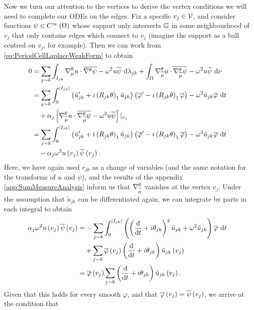 Now we turn our attention to the vertices to derive the vertex conditions we will need to complete our ODEs on the edges.
Fix a specific $v_j\in \mathcal{V}$, and consider functions $\psi\in C^{\infty}\left( \Omega \right)$ whose support only intersects $\mathbb{G}$ in some neighbourhood of $v_j$ that only contains edges which connect to $v_j$ (imagine the support as a ball centred on $v_j$, for example).
Then we can work from \eqref{eq:PeriodCellLaplaceWeakForm} to obtain
\begin{align*}
	0 &= \sum_{j\sim k} \int_{I_{jk}} \nabla^{\theta}_\mu u \cdot \overline{\nabla^{\theta}\psi} - \omega^2 u\overline{\psi}  \ \mathrm{d}\lambda_{jk} 
	+ \int_{\Omega}\nabla^{\theta}_{\widetilde{\mu}}u\cdot\overline{\nabla^{\theta}_{\widetilde{\mu}}\psi}-\omega^2 u\overline{\psi} \ \mathrm{d}\nu \\
	&= \sum_{j\sim k} \int_{0}^{\left\lvert I_{jk} \right\rvert} \left( \tilde{u}_{jk}' + i\left( R_{jk}\theta \right)_1 \tilde{u}_{jk} \right)\left( \overline{\varphi}' - i\left( R_{jk}\theta \right)_1 \overline{\varphi}  \right) - \omega^2 \tilde{u}_{jk}\overline{\varphi} \ \mathrm{d} t \\
	&\quad + \alpha_j\left[  \nabla^{\theta}_{\widetilde{\mu}}u\cdot\overline{\nabla^{\theta}_{\widetilde{\mu}}\psi}-\omega^2 u\overline{\psi}  \right]\vert_{v_j} \\
	&= \sum_{j\sim k} \int_{0}^{\left\lvert I_{jk} \right\rvert} \left( \tilde{u}_{jk}' + i\left( R_{jk}\theta \right)_1 \tilde{u}_{jk} \right)\left( \overline{\varphi}' - i\left( R_{jk}\theta \right)_1 \overline{\varphi}  \right) - \omega^2 \tilde{u}_{jk}\overline{\varphi} \ \mathrm{d} t \\
	&\quad - \alpha_j \omega^2 u\left( v_j \right)\overline{\psi}\left( v_j \right).
\end{align*}
Here, we have again used $r_{jk}$ as a change of variables (and the same notation for the transforms of $u$ and $\psi$), and the results of the appendix \ref{app:SumMeasureAnalysis} inform us that $\nabla^{\theta}_{\widetilde{\mu}}$ vanishes at the vertex $v_j$.
Under the assumption that $\tilde{u}_{jk}$ can be differentiated again, we can integrate by parts in each integral to obtain
\begin{align*}
	\alpha_j\omega^2 u\left( v_j \right)\overline{\psi}\left( v_j \right) &= - \sum_{j\sim k} \int_{0}^{\left\lvert I_{jk} \right\rvert} \left(  \left( \dfrac{\mathrm{d}}{\mathrm{d}t} + i\theta_{jk} \right)^2 \tilde{u}_{jk} +\omega^2 \tilde{u}_{jk}  \right)\overline{\varphi} \ \mathrm{d} t \\
	&\quad + \sum_{j\sim k}\overline{\varphi}\left( v_j \right)\left( \dfrac{\mathrm{d}}{\mathrm{d}t} + i\theta_{jk} \right)\tilde{u}_{jk}\left( v_j \right) \\
	&= \overline{\varphi}\left( v_j \right)\sum_{j\sim k}\left( \dfrac{\mathrm{d}}{\mathrm{d}t} + i\theta_{jk} \right)\tilde{u}_{jk}\left( v_j \right).
\end{align*}
Given that this holds for every smooth $\varphi$, and that $\overline{\varphi}\left( v_j \right)=\overline{\psi}\left( v_j \right)$, we arrive at the condition that
